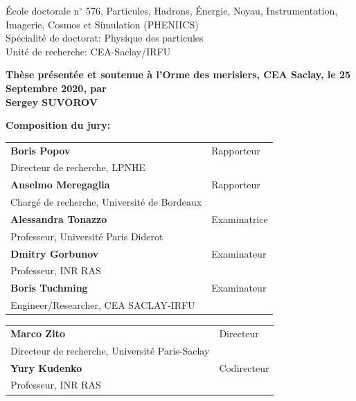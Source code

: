 \documentclass[../main.tex]{subfiles}
\begin{document}
\vspace{15mm}

École doctorale n$^{\circ}$ 576, Particules, Hadrons, Énergie, Noyau, Instrumentation,
Imagerie, Cosmos et Simulation (PHENIICS)\\
\small Spécialité de doctorat: Physique des particules\\
\footnotesize Unité de recherche: CEA-Saclay/IRFU\\
\vspace{15mm}

\textbf{Thèse présentée et soutenue à l'Orme des merisiers, CEA Saclay, le 25 Septembre 2020, par}\\
\bigskip
\Large {\color{Prune} \textbf{Sergey SUVOROV}}


\vspace{\fill} %

\flushleft \small \textbf{Composition du jury:}
\bigskip



\scriptsize
\begin{tabular}{|p{8cm}l}
\textbf{Boris Popov} &   Rapporteur\\
Directeur de recherche, LPNHE & \\
\textbf{Anselmo Meregaglia} &  Rapporteur \\
Chargé de recherche, Université de Bordeaux  &   \\

\textbf{Alessandra Tonazzo} &  Examinatrice \\
Professeur, Université Paris Diderot   &   \\
\textbf{Dmitry Gorbunov} &  Examinateur \\
Professeur, INR RAS   &   \\
\textbf{Boris Tuchming} &  Examinateur \\
Engineer/Researcher, CEA SACLAY-IRFU   &   \\

\end{tabular}

\medskip
\begin{tabular}{|p{8cm}l}\arrayrulecolor{white}
\textbf{Marco Zito} &   Directeur\\
Directeur de recherche, Université Paris-Saclay & \\
\textbf{Yury Kudenko} &   Codirecteur\\
Professeur, INR RAS  &   \\


\end{tabular}
\end{document}
